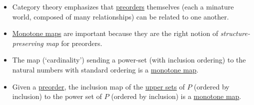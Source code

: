 \begin{itemize}
    \item Category theory emphasizes that \href{doc/1 math/Seven Sketches in Compositionality/1 Generative Effects/Preorders/Preorder}{preorders} themselves (each a minature world, composed of many relationships) can be related to one another.
    \item \href{doc/1 math/Seven Sketches in Compositionality/1 Generative Effects/4 Monotone maps/Monotone map}{Monotone maps} are important because they are the right notion of \emph{structure-preserving map} for preorders.
    \item The map (`cardinality') sending a power-set (with inclusion ordering) to the natural numbers with standard ordering is a \href{doc/1 math/Seven Sketches in Compositionality/1 Generative Effects/4 Monotone maps/Monotone map}{monotone map}.
    \item Given a \href{doc/1 math/Seven Sketches in Compositionality/1 Generative Effects/Preorders/Preorder}{preorder}, the inclusion map of the \href{doc/1 math/Seven Sketches in Compositionality/1 Generative Effects/3 Preorders/Upper set}{upper sets} of $P$ (ordered by inclusion) to the power set of $P$ (ordered by inclusion) is a \href{doc/1 math/Seven Sketches in Compositionality/1 Generative Effects/4 Monotone maps/Monotone map}{monotone map}.

  \end{itemize}